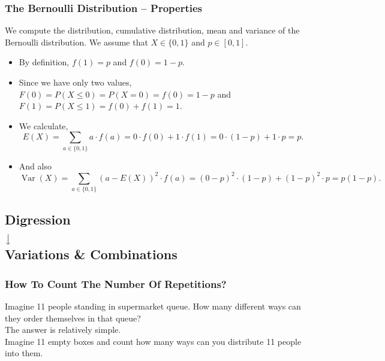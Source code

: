 \documentclass[aspectratio=169,11pt,usenames,dvipsnames,handout]{beamer}
\DeclareMathOperator{\var}{Var}
\begin{document}
\begin{frame}
 \frametitle{The Bernoulli Distribution -- Properties}
 We compute the distribution, cumulative distribution, mean and variance of the
 Bernoulli distribution. We assume that $X \in \{0,1\}$ and $p \in [0,1]$.\\
 \pause
 \begin{itemize}
  \item By definition, $f(1) = p$ and $f(0) = 1 - p$. \pause
  \item Since we have only two values, $F(0) = P(X \leq 0) = P(X = 0) = f(0) = 1
   - p$ and $F(1) = P(X \leq 1) = f(0) + f(1) = 1$. \pause
  \item We calculate,
  \[
   E(X) = \sum_{a \in \{0,1\}} a \cdot f(a) = 0 \cdot f(0) + 1 \cdot f(1) = 0
   \cdot (1-p) + 1 \cdot p = p.
  \]
  \pause
 \item And also
 \[
  \var(X) = \sum_{a \in \{0,1\}} (a - E(X))^2 \cdot f(a) = (0 - p)^2 \cdot (1-p)
  + (1 - p)^2 \cdot p = p(1-p).
 \]
 \end{itemize}
\end{frame}

\subsection{Digression\\ $\big\downarrow$ \\ Variations \& Combinations}

\begin{frame}
 \subsectionpage
\end{frame}

\begin{frame}
 \frametitle{How To Count The Number Of Repetitions?}
 Imagine 11 people standing in supermarket queue. How many different ways can
 they order themselves in that queue?\\ \pause
 The answer is relatively simple.\\ \pause
 Imagine 11 empty boxes and count how many ways can you distribute 11 people
 into them.
 \begin{center}
 \end{center}
\end{frame}
\end{document}
